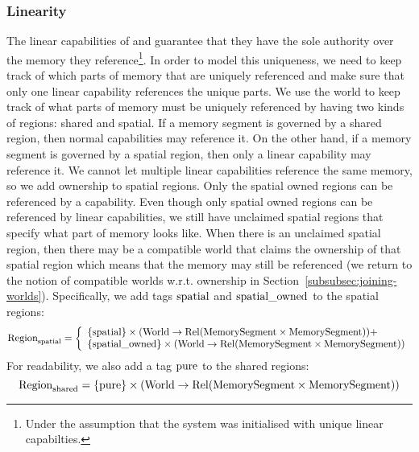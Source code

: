 \begin{jversion}
\subsubsection{Linearity}
The linear capabilities of \srccm{} and \trgcm{} guarantee that they have the sole authority over the memory they reference\footnote{Under the assumption that the system was initialised with unique linear capabilties.}.
In order to model this uniqueness, we need to keep track of which parts of memory that are uniquely referenced and make sure that only one linear capability references the unique parts.
We use the world to keep track of what parts of memory must be uniquely referenced by having two kinds of regions: shared and spatial.
If a memory segment is governed by a shared region, then normal capabilities may reference it.
On the other hand, if a memory segment is governed by a spatial region, then only a linear capability may reference it.
We cannot let multiple linear capabilities reference the same memory, so we add ownership to spatial regions.
Only the spatial owned regions can be referenced by a capability.
Even though only spatial owned regions can be referenced by linear capabilities, we still have unclaimed spatial regions that specify what part of memory looks like.
When there is an unclaimed spatial region, then there may be a compatible world  that claims the ownership of that spatial region which means that the memory may still be referenced (we return to the notion of compatible worlds w.r.t. ownership in Section~\ref{subsubsec:joining-worlds}).
Specifically, we add tags $\mathrm{spatial}$ and $\mathrm{spatial\_owned}$ to the spatial regions:
\[
  \mathrm{Region}_\mathrm{spatial} = \left\{
  \begin{array}{l}
    \{\mathrm{spatial} \} \times (\mathrm{World} \rightarrow \mathrm{Rel}(\mathrm{MemorySegment} \times \mathrm{MemorySegment})) + \\
    \{\mathrm{spatial\_owned} \} \times (\mathrm{World} \rightarrow \mathrm{Rel}(\mathrm{MemorySegment} \times \mathrm{MemorySegment})) \\ 
  \end{array} \right.
\]
For readability, we also add a tag $\mathrm{pure}$ to the shared regions:
\[
  \mathrm{Region}_\mathrm{shared} = \{\mathrm{pure} \} \times (\mathrm{World} \rightarrow \mathrm{Rel}(\mathrm{MemorySegment} \times \mathrm{MemorySegment})) 
\]


\end{jversion}
